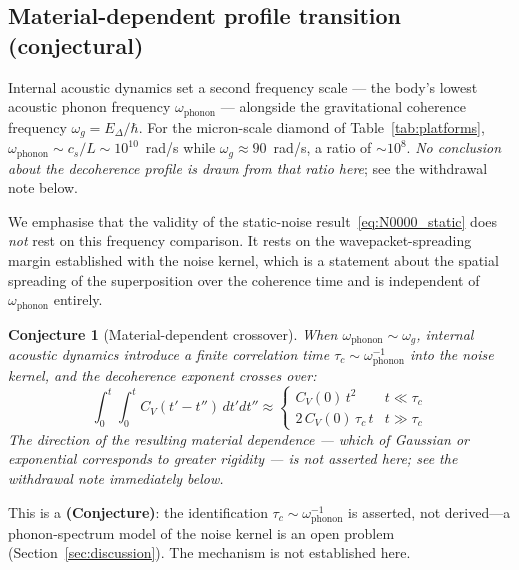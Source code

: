 \documentclass[12pt,a4paper]{article}
\newtheorem{conjecture}{Conjecture}
\theoremstyle{remark}
\begin{document}
\subsection{Material-dependent profile transition (conjectural)}
\label{sec:material}

Internal acoustic dynamics set a second frequency scale --- the body's lowest acoustic
phonon frequency $\omega_{\text{phonon}}$ --- alongside the gravitational coherence
frequency $\omega_g = E_\Delta/\hbar$. For the micron-scale diamond of
Table~\ref{tab:platforms}, $\omega_{\text{phonon}} \sim c_s/L \sim 10^{10}$~rad/s while
$\omega_g \approx 90$~rad/s, a ratio of $\sim10^8$. \emph{No conclusion about the
decoherence profile is drawn from that ratio here}; see the withdrawal note below.

We emphasise that the validity of the static-noise result~\eqref{eq:N0000_static} does
\emph{not} rest on this frequency comparison. It rests on the wavepacket-spreading margin
established with the noise kernel, which is a statement about the spatial spreading of the
superposition over the coherence time and is independent of $\omega_{\text{phonon}}$
entirely.

\begin{conjecture}[Material-dependent crossover]
\label{conj:material}
When $\omega_{\text{phonon}} \sim \omega_g$, internal acoustic dynamics introduce a finite
correlation time $\tau_c \sim \omega_{\text{phonon}}^{-1}$ into the noise kernel, and the
decoherence exponent crosses over:
\begin{equation}
\int_0^t\!\!\int_0^t C_V(t'-t'')\,dt'dt'' \approx
\begin{cases}
C_V(0)\,t^2 & t \ll \tau_c \\
2\,C_V(0)\,\tau_c\,t & t \gg \tau_c
\end{cases}
\label{eq:crossover}
\end{equation}
The direction of the resulting material dependence --- which of Gaussian or exponential
corresponds to greater rigidity --- is \emph{not} asserted here; see the withdrawal note
immediately below.
\end{conjecture}

\noindent
This is a \textbf{(Conjecture)}: the identification $\tau_c \sim
\omega_{\text{phonon}}^{-1}$ is asserted, not derived---a phonon-spectrum model of the
noise kernel is an open problem (Section~\ref{sec:discussion}). The mechanism is not
established here.
\end{document}

